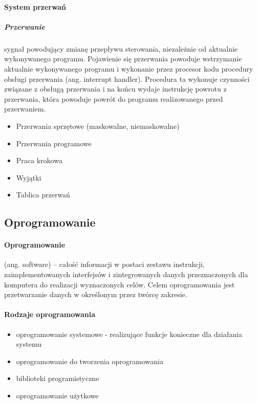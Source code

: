 \documentclass[a4paper,twoside]{report}
\begin{document}
\paragraph{System przerwań}


\subparagraph{Przerwanie} sygnał powodujący zmianę przepływu sterowania, niezależnie od aktualnie wykonywanego programu. Pojawienie się przerwania powoduje wstrzymanie aktualnie wykonywanego programu i wykonanie przez procesor kodu procedury obsługi przerwania (ang. interrupt handler). Procedura ta wykonuje czynności związane z obsługą przerwania i na końcu wydaje instrukcję powrotu z przerwania, która powoduje powrót do programu realizowanego przed przerwaniem.



\begin{itemize}
\item Przerwania sprzętowe (maskowalne, niemaskowalne)
\item Przerwania programowe
\item Praca krokowa
\item Wyjątki
\item Tablica przerwań

\end{itemize}

\subsection{Oprogramowanie}

\paragraph{Oprogramowanie} (ang. software) – całość informacji w postaci zestawu instrukcji, zaimplementowanych interfejsów i zintegrowanych danych przeznaczonych dla komputera do realizacji wyznaczonych celów. Celem oprogramowania jest przetwarzanie danych w określonym przez twórcę zakresie.


\paragraph{Rodzaje oprogramowania \medskip}

\begin{itemize}
\item oprogramowanie systemowe - realizujące funkcje konieczne dla działania systemu
\item oprogramowanie do tworzenia oprogramowania
\item biblioteki programistyczne 
\item oprogramowanie użytkowe
\end{itemize}
\end{document}
